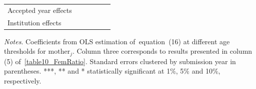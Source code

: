 \begin{table}[H]
\begin{threeparttable}
\begin{tabular}{p{4cm}SSSSS}
            Accepted year effects         &           {}   &           {}   &           {}   &           {}   &           {}   \\
            Institution effects           &           {}   &           {}   &           {}   &           {}   &           {}   \\
            \bottomrule
        \end{tabular}
        \begin{tablenotes}
            \tiny
            \item \textit{Notes}. Coefficients from OLS estimation of~equation~(16) at different age thresholds for \(\text{mother}_j\). Column three corresponds to results presented in column (5) of~\autoref{table10_FemRatio}. Standard errors clustered by submission year in parentheses. ***, ** and * statistically significant at 1\%, 5\% and 10\%, respectively.
        \end{tablenotes}
    \end{threeparttable}
\end{table}